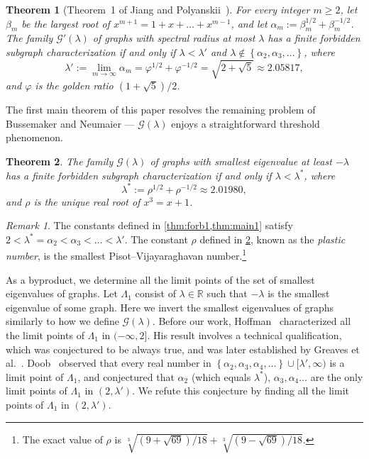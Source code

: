 \documentclass[11pt]{article}
\newtheorem{theorem}{Theorem}[section]
\theoremstyle{definition}
\theoremstyle{remark}
\newtheorem*{remark}{Remark}
\newcommand{\sset}[1]{\left\{{#1}\right\}}
\newcommand{\al}{\alpha}
\newcommand{\be}{\beta}
\newcommand{\la}{\lambda}
\newcommand{\La}{\Lambda}
\newcommand{\G}{\mathcal{G}}
\newcommand{\R}{\mathbb{R}}
\newcommand{\Gp}{\G'(\la)}
\newcommand{\Gl}{\G(\la)}
\begin{document}
\begin{theorem}[Theorem~1 of Jiang and Polyanskii~\cite{JP20}] \label{thm:forb1}
    For every integer $m \ge 2$, let $\be_m$ be the largest root of $x^{m+1} = 1 + x + \dots + x^{m-1}$, and let $\al_m := \be_m^{1/2} + \be_m^{-1/2}$. The family $\Gp$ of graphs with spectral radius at most $\la$ has a finite forbidden subgraph characterization if and only if $\la < \la'$ and $\la \not\in\sset{\al_2, \al_3, \dots}$, where
    \[
        \la' := \lim_{m\to\infty} \al_m = \varphi^{1/2} + \varphi^{-1/2} = \sqrt{2 + \sqrt5} \approx 2.05817,
    \]
    and $\varphi$ is the golden ratio $(1+\sqrt5)/2$.
\end{theorem}

The first main theorem of this paper resolves the remaining problem of Bussemaker and Neumaier --- $\Gl$ enjoys a straightforward threshold phenomenon.

\begin{theorem} \label{thm:main1}
    The family $\Gl$ of graphs with smallest eigenvalue at least $-\la$ has a finite forbidden subgraph characterization if and only if $\la < \la^*$, where
    \[
        \la^* := \rho^{1/2} + \rho^{-1/2} \approx 2.01980,
    \]
    and $\rho$ is the unique real root of $x^3 = x + 1$.
\end{theorem}

\begin{remark}
    The constants defined in \cref{thm:forb1,thm:main1} satisfy $2 < \la^* = \al_2 < \al_3 < \dots < \la'$. The constant $\rho$ defined in \cref{thm:main1}, known as the \emph{plastic number}, is the smallest Pisot--Vijayaraghavan number.\footnote{The exact value of $\rho$ is $\sqrt[3]{(9+\sqrt{69})/18} + \sqrt[3]{(9-\sqrt{69})/18}$.}
\end{remark}

As a byproduct, we determine all the limit points of the set of smallest eigenvalues of graphs. Let $\La_1$ consist of $\la \in \R$ such that $-\la$ is the smallest eigenvalue of some graph. Here we invert the smallest eigenvalues of graphs similarly to how we define $\Gl$. Before our work, Hoffman~\cite{H77a} characterized all the limit points of $\La_1$ in $(-\infty, 2]$. His result involves a technical qualification, which was conjectured to be always true, and was later established by Greaves et al.~\cite[Theorem~1]{GKMST15}. Doob~\cite[Theorem~9]{D89} observed that every real number in $\sset{\al_2, \al_3, \al_4, \dots} \cup [\lambda',\infty)$ is a limit point of $\La_1$, and conjectured that $\alpha_2$ (which equals $\la^*$), $\al_3, \al_4 \dots$ are the only limit points of $\La_1$ in $(2, \la')$. We refute this conjecture by finding all the limit points of $\La_1$ in $(2, \la')$.
\end{document}
